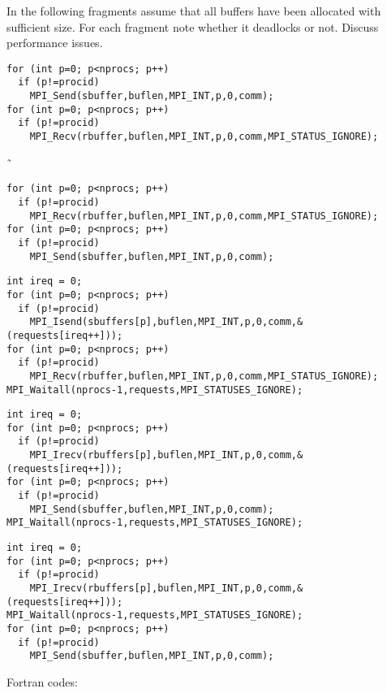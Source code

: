 \begin{review}
  In the following fragments %
  assume that all buffers have been
  allocated with sufficient size. For each fragment note whether it
  deadlocks or not. Discuss performance issues.
\end{review}

    \lstset{language=C,basicstyle=\footnotesize\ttfamily}
\begin{lstlisting}
for (int p=0; p<nprocs; p++)
  if (p!=procid)
    MPI_Send(sbuffer,buflen,MPI_INT,p,0,comm);
for (int p=0; p<nprocs; p++)
  if (p!=procid)
    MPI_Recv(rbuffer,buflen,MPI_INT,p,0,comm,MPI_STATUS_IGNORE);
\end{lstlisting}
˜    %
\begin{lstlisting}
for (int p=0; p<nprocs; p++)
  if (p!=procid)
    MPI_Recv(rbuffer,buflen,MPI_INT,p,0,comm,MPI_STATUS_IGNORE);
for (int p=0; p<nprocs; p++)
  if (p!=procid)
    MPI_Send(sbuffer,buflen,MPI_INT,p,0,comm);
\end{lstlisting}
\begin{lstlisting}
int ireq = 0;
for (int p=0; p<nprocs; p++)
  if (p!=procid)
    MPI_Isend(sbuffers[p],buflen,MPI_INT,p,0,comm,&(requests[ireq++]));
for (int p=0; p<nprocs; p++)
  if (p!=procid)
    MPI_Recv(rbuffer,buflen,MPI_INT,p,0,comm,MPI_STATUS_IGNORE);
MPI_Waitall(nprocs-1,requests,MPI_STATUSES_IGNORE);
\end{lstlisting}
\begin{lstlisting}
int ireq = 0;
for (int p=0; p<nprocs; p++)
  if (p!=procid)
    MPI_Irecv(rbuffers[p],buflen,MPI_INT,p,0,comm,&(requests[ireq++]));
for (int p=0; p<nprocs; p++)
  if (p!=procid)
    MPI_Send(sbuffer,buflen,MPI_INT,p,0,comm);
MPI_Waitall(nprocs-1,requests,MPI_STATUSES_IGNORE);
\end{lstlisting}
\begin{lstlisting}
int ireq = 0;
for (int p=0; p<nprocs; p++)
  if (p!=procid)
    MPI_Irecv(rbuffers[p],buflen,MPI_INT,p,0,comm,&(requests[ireq++]));
MPI_Waitall(nprocs-1,requests,MPI_STATUSES_IGNORE);
for (int p=0; p<nprocs; p++)
  if (p!=procid)
    MPI_Send(sbuffer,buflen,MPI_INT,p,0,comm);
\end{lstlisting}

    \pagebreak
    Fortran codes:
    
    \lstset{style=reviewcode,language=Fortran}

